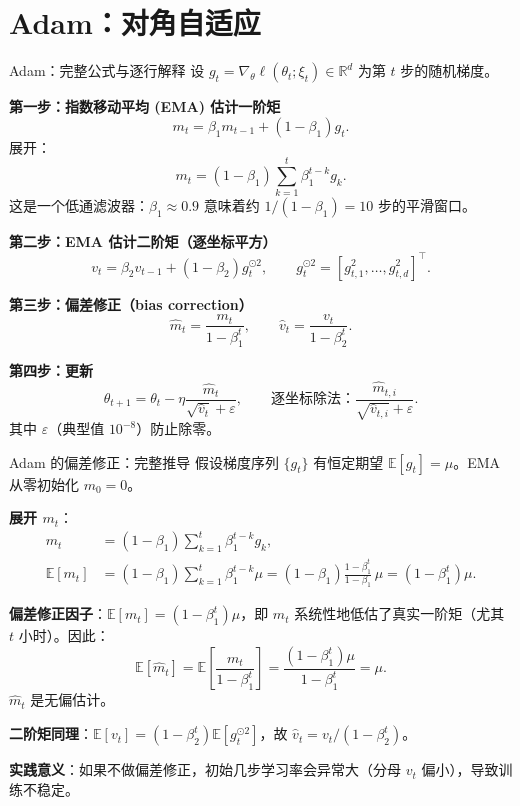 \documentclass[aspectratio=169,10pt]{ctexbeamer}
\newcommand{\R}{\mathbb{R}}
\newcommand{\E}{\mathbb{E}}
\newcommand{\eps}{\varepsilon}
\newcommand{\grad}{\nabla}
\begin{document}
\section{Adam：对角自适应}

\begin{frame}{Adam：完整公式与逐行解释}
设 $g_t=\grad_\theta\ell(\theta_t;\xi_t)\in\R^d$ 为第 $t$ 步的随机梯度。

\vspace{.2cm}
\textbf{第一步：指数移动平均 (EMA) 估计一阶矩}
\[
  m_t=\beta_1 m_{t-1}+(1-\beta_1)g_t.
\]
展开：
\[
  m_t=(1-\beta_1)\sum_{k=1}^t\beta_1^{t-k}g_k.
\]
这是一个低通滤波器：$\beta_1\approx0.9$ 意味着约 $1/(1-\beta_1)=10$ 步的平滑窗口。

\vspace{.2cm}
\textbf{第二步：EMA 估计二阶矩（逐坐标平方）}
\[
  v_t=\beta_2 v_{t-1}+(1-\beta_2)g_t^{\odot2},\qquad
  g_t^{\odot2}=[g_{t,1}^2,\ldots,g_{t,d}^2]^\top.
\]

\vspace{.2cm}
\textbf{第三步：偏差修正（bias correction）}
\[
  \hat m_t=\frac{m_t}{1-\beta_1^t},\qquad
  \hat v_t=\frac{v_t}{1-\beta_2^t}.
\]

\vspace{.2cm}
\textbf{第四步：更新}
\[
  \theta_{t+1}=\theta_t-\eta\frac{\hat m_t}{\sqrt{\hat v_t}+\eps},\qquad
  \text{逐坐标除法：}\frac{\hat m_{t,i}}{\sqrt{\hat v_{t,i}}+\eps}.
\]
其中 $\eps$（典型值 $10^{-8}$）防止除零。
\end{frame}

\begin{frame}{Adam 的偏差修正：完整推导}
假设梯度序列 $\{g_t\}$ 有恒定期望 $\E[g_t]=\mu$。EMA 从零初始化 $m_0=0$。

\vspace{.25cm}
\textbf{展开 $m_t$}：
\[
  \begin{aligned}
  m_t &= (1-\beta_1)\sum_{k=1}^t\beta_1^{t-k}g_k,\\[3pt]
  \E[m_t] &= (1-\beta_1)\sum_{k=1}^t\beta_1^{t-k}\mu
           = (1-\beta_1)\frac{1-\beta_1^t}{1-\beta_1}\,\mu
           = (1-\beta_1^t)\mu.
  \end{aligned}
\]

\vspace{.2cm}
\textbf{偏差修正因子}：$\E[m_t]=(1-\beta_1^t)\mu$，即 $m_t$ 系统性地低估了真实一阶矩（尤其 $t$ 小时）。因此：
\[
  \E[\hat m_t]=\E\!\left[\frac{m_t}{1-\beta_1^t}\right]=\frac{(1-\beta_1^t)\mu}{1-\beta_1^t}=\mu.
\]
$\hat m_t$ 是无偏估计。

\vspace{.2cm}
\textbf{二阶矩同理}：$\E[v_t]=(1-\beta_2^t)\E[g_t^{\odot2}]$，故 $\hat v_t=v_t/(1-\beta_2^t)$。

\vspace{.25cm}
\textbf{实践意义}：如果不做偏差修正，初始几步学习率会异常大（分母 $v_t$ 偏小），导致训练不稳定。
\end{frame}
\end{document}
